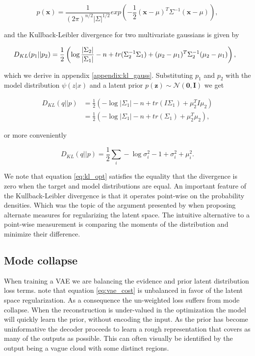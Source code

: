 \begin{equation}
p(\mathbf{x}) = \frac{1}{(2\pi)^{n/2}|\Sigma|^{1/2}}exp(-\frac{1}{2}(\mathbf{x} - \mathbb{\mu})^T\Sigma^{-1}(\mathbf{x}-\mu)),
\end{equation}

\noindent and the Kullback-Leibler divergence for two multivariate gaussians is given by 


\begin{equation}
\hspace*{-0.1in}
D_{KL}(p_1|| p_2 ) = \frac{1}{2} \left( \log \frac{|\Sigma_2|}{|\Sigma_1|} -n + tr(\Sigma^{-1}_2 \Sigma_1) + (\mu_2 - \mu_1)^T\Sigma_2^{-1}(\mu_2 - \mu_1) \right),
\end{equation}

\noindent which we derive in appendix \ref{appendix:kl_gauss}. Substituting $p_1$ and $p_2$ with the model distribution $\psi(z|x)$ and a latent prior $p(\mathbf{z}) \sim \mathcal{N}(\mathbf{0}, \mathbf{I})$ we get 

\begin{align*}
D_{KL}(q||p) &= \frac{1}{2} \left( - \log {|\Sigma_1|} -n + tr(I \Sigma_1) + \mu_2 ^TI\mu_2 \right) \\
&= \frac{1}{2} \left( - \log {|\Sigma_1|} -n + tr(\Sigma_1) + \mu_2 ^T\mu_2 \right),
\end{align*}

\noindent or more conveniently

\begin{equation}\label{eq:kl_opt}
D_{KL}(q||p) = \frac{1}{2} \sum_i -\log \sigma_i^2 - 1 + \sigma^2_i + \mu_i^2 .
\end{equation}


\noindent We note that equation \ref{eq:kl_opt} satisfies the equality that the divergence is zero when the target and model distributions are equal. An important feature of the Kullback-Leibler divergence is that it operates point-wise on the probability densities. Which was the topic of the argument presented by \citet{Zhao} when proposing alternate measures for regularizing the latent space. The intuitive alternative to a point-wise measurement is comparing the moments of the distribution and minimize their difference. 

\subsection{Mode collapse}\label{sec:mode_collapse}

When training a VAE we are balancing the evidence and prior latent distribution loss terms. \citet{Kingma2013} note that equation \ref{eq:vae_cost} is unbalanced in favor of the latent space regularization. As a consequence the un-weighted loss suffers from mode collapse. When the reconstruction is under-valued in the optimization the model will quickly learn the prior, without encoding the input. As the prior has become uninformative the decoder proceeds to learn a rough representation that covers as many of the outputs as possible. This can often visually be identified by the output being a vague cloud with some distinct regions. 